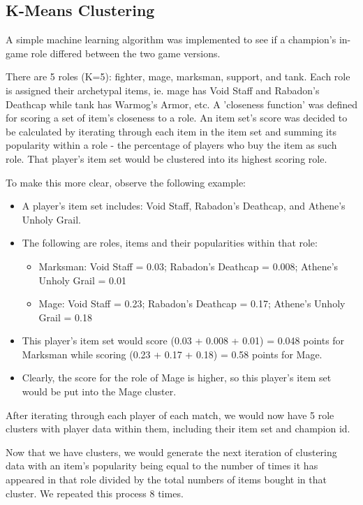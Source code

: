 \documentclass{article}
\begin{document}
\subsection{K-Means Clustering}
A simple machine learning algorithm was implemented to see if a champion's in-game role differed between the two game versions. 

There are 5 roles (K=5): fighter, mage, marksman, support, and tank. Each role is assigned their archetypal items, ie. mage has Void Staff and Rabadon's Deathcap while tank has Warmog's Armor, etc. A 'closeness function' was defined for scoring a set of item's closeness to a role. An item set's score was decided to be calculated by iterating through each item in the item set and summing its popularity within a role - the percentage of players who buy the item as such role. That player's item set would be clustered into its highest scoring role.

To make this more clear, observe the following example:
\begin{itemize}
    \item A player's item set includes: Void Staff, Rabadon's Deathcap, and Athene's Unholy Grail.
    \item The following are roles, items and their popularities within that role:
    \begin{itemize}
        \item Marksman: Void Staff = 0.03; Rabadon's Deathcap = 0.008; Athene's Unholy Grail = 0.01
        \item Mage: Void Staff = 0.23; Rabadon's Deathcap = 0.17; Athene's Unholy Grail = 0.18
    \end{itemize}
    \item This player's item set would score (0.03 + 0.008 + 0.01) = 0.048 points for Marksman while scoring (0.23 + 0.17 + 0.18) = 0.58 points for Mage.
    \item Clearly, the score for the role of Mage is higher, so this player's item set would be put into the Mage cluster.
\end{itemize}

After iterating through each player of each match, we would now have 5 role clusters with player data within them, including their item set and champion id.

Now that we have clusters, we would generate the next iteration of clustering data with an item's popularity being equal to the number of times it has appeared in that role divided by the total numbers of items bought in that cluster. We repeated this process 8 times.
\end{document}
